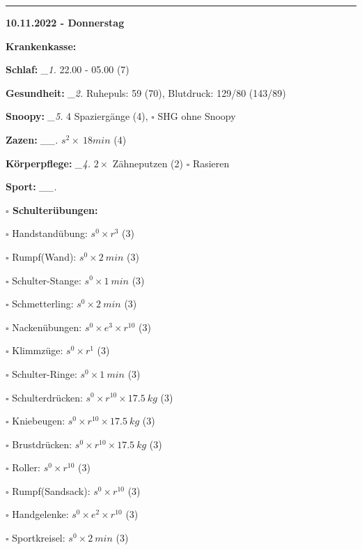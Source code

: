 \documentclass[10pt,a4paper]{article}
\newcommand\prop[1] {{\color {alizarin} {\bf #1}}}             %
\newcommand\rele[1] {{\color {english} \bf {#1}}}              %
\newcommand\mand[1] {{\color {burntorange} {\bf #1}}}          %
\newcommand\ddivide {\vskip -9pt \hrule \vskip 6pt}
\newcommand\topspace{\vskip -15pt \hskip 20pt}
\newcommand\n[1] { {\sl #1.} \hskip 5pt }
\begin{document}
\ddivide
{\rele {10.11.2022 - Donnerstag}}

\begin{mdframed}[style=daystyle]
  \begin{labeling}{{\mand {Krankenkasse:}}}
    \setlength\itemsep{-3pt}
  \item[{\mand {Schlaf:}}]        \n{\_1} 22.00 - 05.00 (7)
  \item[{\mand {Gesundheit:}}]    \n{\_2} Ruhepuls: 59 (70), Blutdruck: 129/80 (143/89)
  \item[{\mand {Snoopy:}}]        \n{\_5} 4 Spaziergänge (4), $\square$ SHG ohne Snoopy
  \item[{\mand {Zazen:}}]        \n{\_\_} $s^2 \times\ 18 min$ (4)
  \item[{\mand {Körperpflege:}}]  \n{\_4} $2 \times$ Zähneputzen (2) $\square$ Rasieren
  \item[{\mand {Sport:}}]        \n{\_\_}
    \topspace
    \begin{minipage}{0.75\textwidth}  
      \begin{labeling}{\prop {$\square$ {Schulterübungen:}}} 
        \setlength\itemsep{-3pt}
      \item[$\square$ Handstandübung:]  $s^0 \times r^{3}$ (3)
      \item[$\square$ Rumpf(Wand):]     $s^0 \times 2\ min$ (3)
      \item[$\square$ Schulter-Stange:] $s^0 \times 1\ min$ (3)
      \item[$\square$ Schmetterling:]   $s^0 \times 2\ min$ (3)
      \item[$\square$ Nackenübungen:]   $s^0 \times e^3 \times r^{10}$ (3)
      \item[$\square$ Klimmzüge:]       $s^0 \times r^1$ (3)
      \item[$\square$ Schulter-Ringe:]  $s^0 \times 1\ min$ (3)
      \item[$\square$ Schulterdrücken:] $s^0 \times r^{10} \times 17.5\ kg$ (3)
      \item[$\square$ Kniebeugen:]      $s^0 \times r^{10} \times 17.5\ kg$ (3)
      \item[$\square$ Brustdrücken:]    $s^0 \times r^{10} \times 17.5\ kg$ (3)
      \item[$\square$ Roller:]          $s^0 \times r^{10}$ (3)
      \item[$\square$ Rumpf(Sandsack):] $s^0 \times r^{10}$ (3)
      \item[$\square$ Handgelenke:]     $s^0 \times e^2 \times r^{10}$ (3)
      \item[$\square$ Sportkreisel:]    $s^0 \times 2\ min$ (3)

\end{labeling}
\end{minipage}
\end{labeling}
\end{mdframed}
\end{document}
